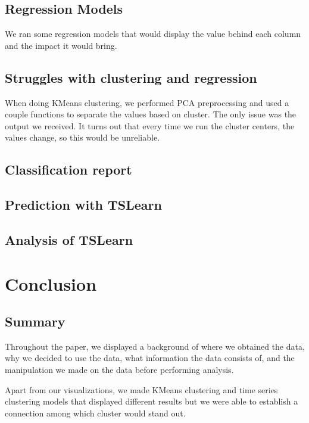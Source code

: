 \documentclass[conference]{IEEEtran}
\begin{document}
\subsection{Regression Models}

We ran some regression models that would display the value behind each column and the impact it would bring. 

\subsection{Struggles with clustering and regression}

When doing KMeans clustering, we performed PCA preprocessing and used a couple functions to separate the values based on cluster. The only issue was the output we received. It turns out that every time we run the cluster centers, the values change, so this would be unreliable. 

\subsection{Classification report}

\subsection{Prediction with TSLearn}

\subsection{Analysis of TSLearn}

\section{Conclusion}

\subsection{Summary}

Throughout the paper, we displayed a background of where we obtained the data, why we decided to use the data, what information the data consists of, and the manipulation we made on the data before performing analysis. 

Apart from our visualizations, we made KMeans clustering and time series clustering models that displayed different results but we were able to establish a connection among which cluster would stand out. 
\end{document}
